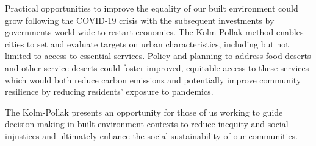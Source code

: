 \documentclass[final,3p,times,onecolumn,sort&compress]{elsarticle}
\begin{document}
Practical opportunities to improve the equality of our built environment could grow following the COVID-19 crisis with the subsequent investments by governments world-wide to restart economies.
The Kolm-Pollak method enables cities to set and evaluate targets on urban characteristics, including but not limited to access to essential services. 
Policy and planning to address food-deserts and other service-deserts could foster improved, equitable access to these services which would both reduce carbon emissions and potentially improve community resilience by reducing residents' exposure to pandemics.

The Kolm-Pollak presents an opportunity for those of us working to guide decision-making in built environment contexts to reduce inequity and social injustices and ultimately enhance the  social sustainability of our communities.



\clearpage
\newpage
\linenumbers
\appendix
\section{}
\end{document}
